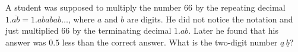 A student was supposed to multiply the number $66$ by the repeating decimal $1.\overline{ab}=1.ababab\ldots$, where $a$ and $b$ are digits. He did not notice the notation and just multiplied $66$ by the terminating decimal $1.ab$. Later he found that his answer was $0.5$ less than the correct answer. What is the two-digit number $\underline{a}\,\underline{b}$?
